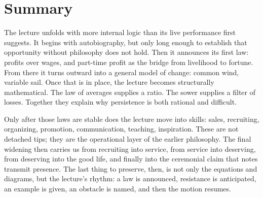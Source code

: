 \section{Summary}

The lecture unfolds with more internal logic than its live performance first suggests. It begins with autobiography, but only long enough to establish that opportunity without philosophy does not hold. Then it announces its first law: profits over wages, and part-time profit as the bridge from livelihood to fortune. From there it turns outward into a general model of change: common wind, variable sail. Once that is in place, the lecture becomes structurally mathematical. The law of averages supplies a ratio. The sower supplies a filter of losses. Together they explain why persistence is both rational and difficult.

Only after those laws are stable does the lecture move into skills: sales, recruiting, organizing, promotion, communication, teaching, inspiration. These are not detached tips; they are the operational layer of the earlier philosophy. The final widening then carries us from recruiting into service, from service into deserving, from deserving into the good life, and finally into the ceremonial claim that notes transmit presence. The last thing to preserve, then, is not only the equations and diagrams, but the lecture's rhythm: a law is announced, resistance is anticipated, an example is given, an obstacle is named, and then the motion resumes.